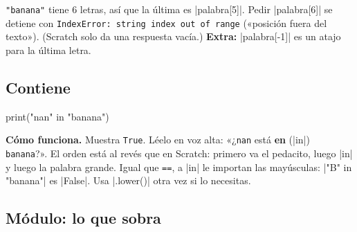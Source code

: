 \begin{watchout}
\texttt{"banana"} tiene 6 letras, así que la última es \py|palabra[5]|. Pedir \py|palabra[6]| se detiene con \texttt{IndexError: string index out of range} («posición fuera del texto»). (Scratch solo da una respuesta vacía.) \textbf{Extra:} \py|palabra[-1]| es un atajo para la última letra.
\end{watchout}

\subsection*{Contiene}

\begin{tcbraster}[raster columns=2, raster equal height=rows, raster column skip=12pt, raster valign=center, raster force size=false, raster odd column/.style={add to width=-1.2cm}, raster even column/.style={add to width=1.2cm}]
\begin{tcolorbox}[colback=white, colframe=white, boxrule=0pt, valign=center]
\begin{scratch}
\end{scratch}
\end{tcolorbox}
\begin{code}
print("nan" in "banana")
\end{code}
\end{tcbraster}

\textbf{Cómo funciona.} Muestra \texttt{True}. Léelo en voz alta: «¿\texttt{nan} está \textbf{en} (\py|in|) \texttt{banana}?». El orden está al revés que en Scratch: primero va el pedacito, luego \py|in| y luego la palabra grande. Igual que \texttt{==}, a \py|in| le importan las mayúsculas: \py|"B" in "banana"| es \py|False|. Usa \py|.lower()| otra vez si lo necesitas.

\subsection*{Módulo: lo que sobra}

